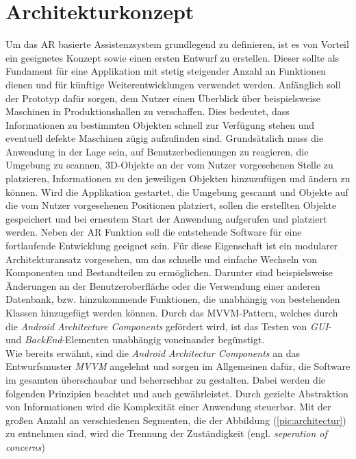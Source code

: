 \section{Architekturkonzept}
\label{chap:Architekturkonzept}
Um das \acl{AR} basierte Assistenzsystem grundlegend zu definieren, ist es von Vorteil ein geeignetes Konzept sowie einen ersten Entwurf zu 
erstellen. Dieser sollte als Fundament für eine Applikation mit stetig steigender Anzahl an Funktionen dienen und für künftige Weiterentwicklungen 
verwendet werden. Anfänglich soll der Prototyp dafür sorgen, dem Nutzer einen Überblick über beispielsweise Maschinen in Produktionshallen zu 
verschaffen. Dies bedeutet, dass Informationen zu bestimmten Objekten schnell zur Verfügung stehen und eventuell defekte Maschinen zügig 
aufzufinden sind. Grundsätzlich muss die Anwendung in der Lage sein, auf Benutzerbedienungen zu reagieren, die Umgebung zu scannen, 3D-Objekte 
an der vom Nutzer vorgesehenen Stelle zu platzieren, Informationen zu den jeweiligen Objekten hinzuzufügen und ändern zu können. Wird die 
Applikation gestartet, die Umgebung gescannt und Objekte auf die vom Nutzer vorgesehenen Positionen platziert, sollen die erstellten Objekte 
gespeichert und bei erneutem Start der Anwendung aufgerufen und platziert werden. Neben der \acl{AR} Funktion soll die %
entstehende Software für eine fortlaufende Entwicklung geeignet sein. Für diese Eigenschaft ist ein modularer Architekturansatz vorgesehen, 
um das schnelle und einfache Wechseln von Komponenten und Bestandteilen zu ermöglichen. Darunter sind beispielsweise Änderungen an der 
Benutzeroberfläche oder die Verwendung einer anderen Datenbank, bzw. hinzukommende Funktionen, die unabhängig von bestehenden Klassen 
hinzugefügt werden können. Durch das \acs{MVVM}-Pattern, welches durch die \textit{Android Architecture Components} gefördert wird, ist 
das Testen von \textit{\acs{GUI}}- und \textit{BackEnd}-Elementen unabhängig voneinander begünstigt. 
\\ 
\linebreak
Wie bereits erwähnt, sind die \textit{Android Architectur Components} an das Entwurfsmuster \textit{MVVM} angelehnt und sorgen im Allgemeinen 
dafür, die Software im gesamten überschaubar und beherrschbar zu gestalten. Dabei werden die folgenden Prinzipien beachtet und auch gewährleistet. 
Durch gezielte Abstraktion von Informationen wird die Komplexität einer Anwendung steuerbar. Mit der großen Anzahl an verschiedenen 
Segmenten, die der Abbildung (\ref{pic:architectur}) zu entnehmen sind, wird die Trennung der Zuständigkeit (engl. \textit{seperation of concerns}) 
